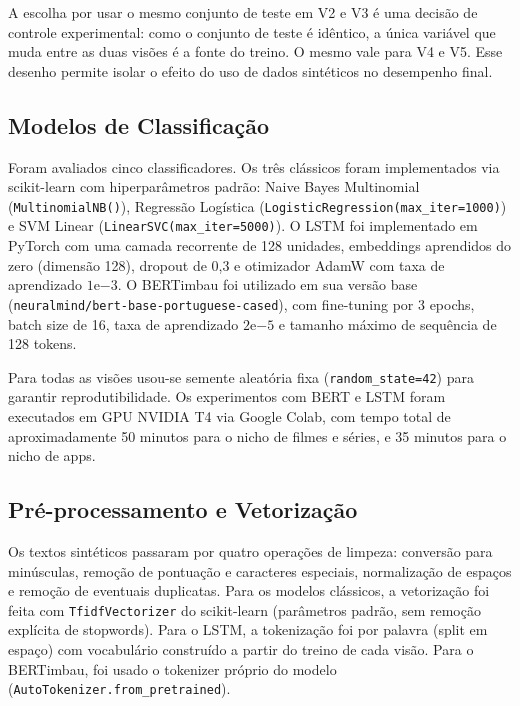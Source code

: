 \documentclass[12pt]{article}
\begin{document}
A escolha por usar o mesmo conjunto de teste em V2 e V3 é uma decisão de controle experimental: como o conjunto de teste é idêntico, a única variável que muda entre as duas visões é a fonte do treino. O mesmo vale para V4 e V5. Esse desenho permite isolar o efeito do uso de dados sintéticos no desempenho final.

\subsection{Modelos de Classificação}

Foram avaliados cinco classificadores. Os três clássicos foram implementados via scikit-learn \cite{pedregosa2011} com hiperparâmetros padrão: Naive Bayes Multinomial (\texttt{MultinomialNB()}), Regressão Logística (\texttt{LogisticRegression(max\_iter=1000)}) e SVM Linear (\texttt{LinearSVC(max\_iter=5000)}). O LSTM foi implementado em PyTorch com uma camada recorrente de 128 unidades, embeddings aprendidos do zero (dimensão 128), dropout de 0,3 e otimizador AdamW com taxa de aprendizado $1\mathrm{e}{-3}$. O BERTimbau \cite{souza2022brazilian} foi utilizado em sua versão base (\texttt{neuralmind/bert-base-portuguese-cased}), com fine-tuning por 3 epochs, batch size de 16, taxa de aprendizado $2\mathrm{e}{-5}$ e tamanho máximo de sequência de 128 tokens.

Para todas as visões usou-se semente aleatória fixa (\texttt{random\_state=42}) para garantir reprodutibilidade. Os experimentos com BERT e LSTM foram executados em GPU NVIDIA T4 via Google Colab, com tempo total de aproximadamente 50 minutos para o nicho de filmes e séries, e 35 minutos para o nicho de apps.

\subsection{Pré-processamento e Vetorização}

Os textos sintéticos passaram por quatro operações de limpeza: conversão para minúsculas, remoção de pontuação e caracteres especiais, normalização de espaços e remoção de eventuais duplicatas. Para os modelos clássicos, a vetorização foi feita com \texttt{TfidfVectorizer} do scikit-learn (parâmetros padrão, sem remoção explícita de stopwords). Para o LSTM, a tokenização foi por palavra (split em espaço) com vocabulário construído a partir do treino de cada visão. Para o BERTimbau, foi usado o tokenizer próprio do modelo (\texttt{AutoTokenizer.from\_pretrained}).
\end{document}
